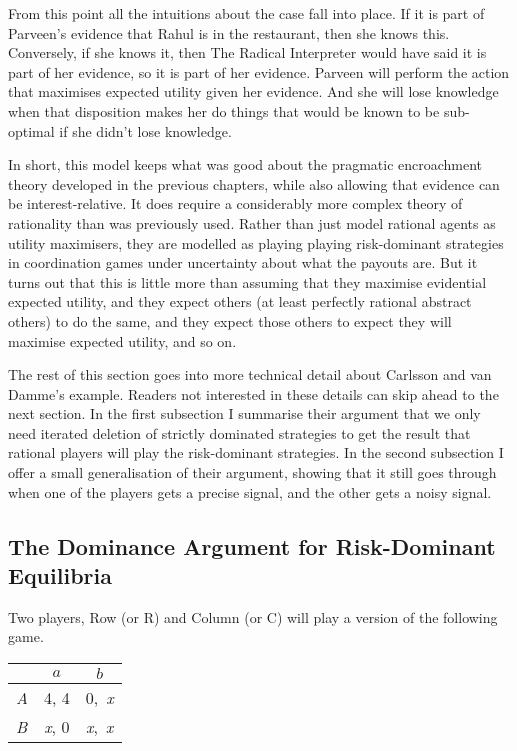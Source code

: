 \documentclass[
  11pt,
]{book}
\begin{document}
From this point all the intuitions about the case fall into place. If it is part of Parveen's evidence that Rahul is in the restaurant, then she knows this. Conversely, if she knows it, then The Radical Interpreter would have said it is part of her evidence, so it is part of her evidence. Parveen will perform the action that maximises expected utility given her evidence. And she will lose knowledge when that disposition makes her do things that would be known to be sub-optimal if she didn't lose knowledge.

In short, this model keeps what was good about the pragmatic encroachment theory developed in the previous chapters, while also allowing that evidence can be interest-relative. It does require a considerably more complex theory of rationality than was previously used. Rather than just model rational agents as utility maximisers, they are modelled as playing playing risk-dominant strategies in coordination games under uncertainty about what the payouts are. But it turns out that this is little more than assuming that they maximise evidential expected utility, and they expect others (at least perfectly rational abstract others) to do the same, and they expect those others to expect they will maximise expected utility, and so on.

The rest of this section goes into more technical detail about Carlsson and van Damme's example. Readers not interested in these details can skip ahead to the next section. In the first subsection I summarise their argument that we only need iterated deletion of strictly dominated strategies to get the result that rational players will play the risk-dominant strategies. In the second subsection I offer a small generalisation of their argument, showing that it still goes through when one of the players gets a precise signal, and the other gets a noisy signal.

\hypertarget{cvdproof}{%
\subsection{The Dominance Argument for Risk-Dominant Equilibria}\label{cvdproof}}

Two players, Row (or R) and Column (or C) will play a version of the following game.

\begin{longtable}[]{@{}lcc@{}}
\toprule\noalign{}
& \(a\) & \(b\) \\
\midrule\noalign{}
\endhead
\bottomrule\noalign{}
\endlastfoot
\emph{A} & 4, 4 & 0,~\emph{x} \\
\emph{B} & \emph{x}, 0 & \emph{x},~\emph{x} \\
\end{longtable}
\end{document}
